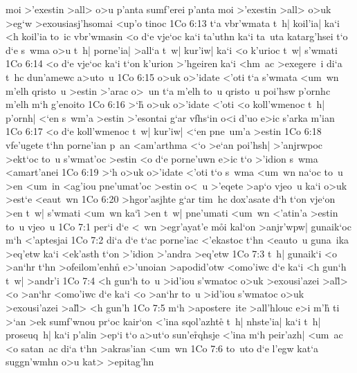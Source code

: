moi
>'exestin
>all>
o>u
p'anta
sumf'erei
p'anta
moi
>'exestin
>all>
o>uk
>eg`w
>exousiasj'hsomai
<up'o
tinoc\bibvsend
\vs 1Co 6:13
t`a
vbr'wmata
t~h|
koil'ia|
ka`i
<h
koil'ia
to~ic
vbr'wmasin
<o
d`e
vje`oc
ka`i
ta'uthn
ka`i
ta~uta
katarg'hsei
t`o
d`e
s~wma
o>u
t~h|
porne'ia|
>all`a
t~w|
kur'iw|
ka`i
<o
k'urioc
t~w|
s'wmati\bibvsend
\vs 1Co 6:14
<o
d`e
vje`oc
ka`i
t`on
k'urion
>'hgeiren
ka`i
<hm~ac
>exegere~i
di`a
t~hc
dun'amewc
a>uto~u\bibvsend
\vs 1Co 6:15
o>uk
o>'idate
<'oti
t`a
s'wmata
<um~wn
m'elh
qristo~u
>estin
>'arac
o>~un
t`a
m'elh
to~u
qristo~u
poi'hsw
p'ornhc
m'elh
m`h
g'enoito\bibvsend
\vs 1Co 6:16
>`h\r{}
o>uk
o>'idate
<'oti
<o
koll'wmenoc
t~h|
p'ornh|
<`en
s~wm'a
>estin
>'esontai
g`ar
vfhs`in
o<i
d'uo
e>ic
s'arka
m'ian\bibvsend
\vs 1Co 6:17
<o
d`e
koll'wmenoc
t~w|
kur'iw|
<`en
pne~um'a
>estin\bibvsend
\vs 1Co 6:18
vfe'ugete
t`hn
porne'ian
p~an
<am'arthma
<`o
>e`an
poi'hsh|
>'anjrwpoc
>ekt`oc
to~u
s'wmat'oc
>estin
<o
d`e
porne'uwn
e>ic
t`o
>'idion
s~wma
<amart'anei\bibvsend
\vs 1Co 6:19
>`h
o>uk
o>'idate
<'oti
t`o
s~wma
<um~wn
na`oc
to~u
>en
<um~in
<ag'iou
pne'umat'oc
>estin
o<~u
>'eqete
>ap`o
vjeo~u
ka`i
o>uk
>est`e
<eaut~wn\bibvsend
\vs 1Co 6:20
>hgor'asjhte
g`ar
tim~hc
dox'asate
d`h
t`on
vje`on
>en
t~w|
s'wmati
<um~wn
ka`i\r{}
>en
t~w|
pne'umati
<um~wn
<'atin'a
>estin
to~u
vjeo~u\bibvsend
\vs 1Co 7:1
per`i
d`e
<~wn
>egr'ayat'e
m\r{o}i
kal`on
>anjr'wpw|
gunaik`oc
m`h
<'aptesjai\bibvsend
\vs 1Co 7:2
di`a
d`e
t`ac
porne'iac
<'ekastoc
t`hn
<eauto~u
guna~ika
>eq'etw
ka`i
<ek'asth
t`on
>'idion
>'andra
>eq'etw\bibvsend
\vs 1Co 7:3
t~h|
gunaik`i
<o
>an`hr
t`hn
>ofeilom'enhn\r{}
e>'unoian
>apodid'otw
<omo'iwc
d`e
ka`i
<h
gun`h
t~w|
>andr'i\bibvsend
\vs 1Co 7:4
<h
gun`h
to~u
>id'iou
s'wmatoc
o>uk
>exousi'azei
>al\r{l}>
<o
>an`hr
<omo'iwc
d`e
ka`i
<o
>an`hr
to~u
>id'iou
s'wmatoc
o>uk
>exousi'azei
>al\r{l}>
<h
gun'h\bibvsend
\vs 1Co 7:5
m`h
>apostere~ite
>all'hlouc
e>i
m'h\r{}
ti
>`an
>ek
sumf'wnou
pr`oc
kair`on
<'ina
sqol'azhte\r{}
t~h|
nhste'ia|
ka`i
t~h|
proseuq~h|
ka`i
p'alin
>ep`i
t`o
a>ut`o
sun'e\r{r}qhsje
<'ina
m`h
peir'azh|
<um~ac
<o
satan~ac
di`a
t`hn
>akras'ian
<um~wn\bibvsend
\vs 1Co 7:6
to~uto
d`e
l'egw
kat`a
suggn'wmhn
o>u
kat>
>epitag'hn\bibvsend
